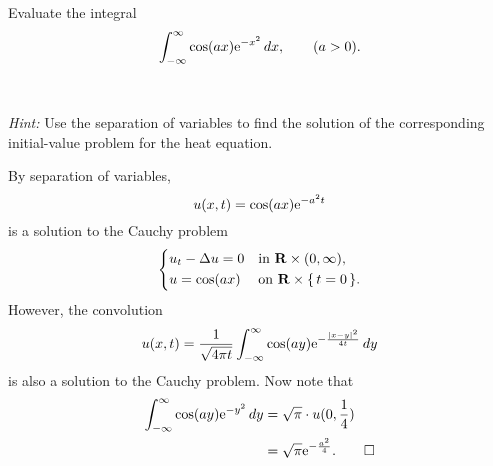 \begin{problem}
  Evaluate the integral
  \[
    \int_{-\infty}^\infty \cos(ax)\mathrm{e}^{-x^2}\mathop{}\!d x,\qquad (a>0).
  \]
  \\\\
  \emph{Hint:} Use the separation of variables to find the solution of the
  corresponding initial-value problem for the heat equation.
\end{problem}
\begin{solution*}
  By separation of variables,
  \[
    u(x,t)=\cos(ax)\mathrm{e}^{-a^2t}
  \]
  is a solution to the Cauchy problem
  \[
    \left\{
      \begin{aligned}
        &u_t-\Delta u=0&&\text{in \(\mathbf{R}\times(0,\infty)\),}\\
        &u=\cos(ax)&&\text{on \(\mathbf{R}\times\{\,t=0\,\}\).}
      \end{aligned}
    \right.
  \]
  However, the convolution
  \[
    u(x,t)=%
    \frac{1}{\sqrt{4\pi t}}\int_{-\infty}^\infty%
    \cos(a y)\rme^{-\frac{|x-y|^2}{4t}}\diff y
  \]
  is also a solution to the Cauchy problem. Now note that
  \begin{align*}
    \int_{-\infty}^\infty\cos(ay)\mathrm{e}^{-y^2}\mathop{}\!d y
    &=\sqrt{\pi}\cdot u(0,\frac{1}{4})\\
    &=\sqrt{\pi}\mathrm{e}^{-\frac{a^2}{4}}.\qedhere
  \end{align*}
\end{solution*}

